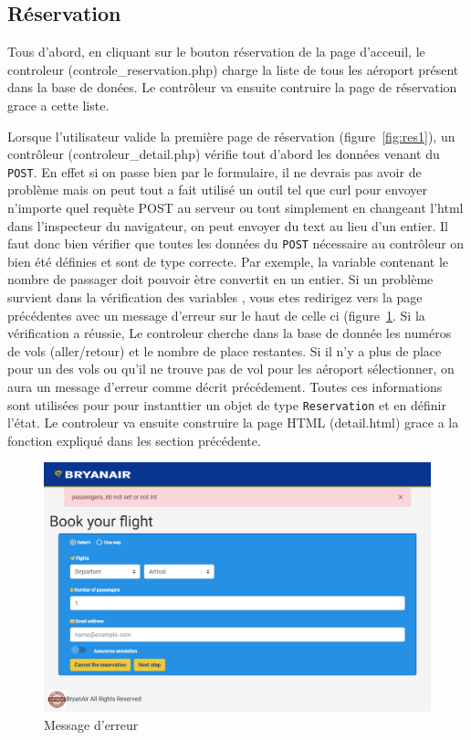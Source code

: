 \documentclass[12pt,a4paper]{article}
\begin{document}
		\subsection{Réservation}
      Tous d'abord, en cliquant sur le bouton réservation de la page d'acceuil, le controleur (controle\_reservation.php) charge la liste de tous les aéroport présent dans la base de donées. Le contrôleur va ensuite contruire la page de réservation grace a cette liste.

			Lorsque l'utilisateur valide la première page de réservation (figure~\ref{fig:res1}), un contrôleur (controleur\_detail.php) vérifie tout d'abord les données venant du \texttt{POST}. En effet si on passe bien par le formulaire, il ne devrais pas avoir de problème mais on peut tout a fait utilisé un outil tel que curl pour envoyer n'importe quel requète POST au serveur ou tout simplement en changeant l'html dans l'inspecteur du navigateur, on peut envoyer du text au lieu d'un entier. Il faut donc bien vérifier que toutes les données du \texttt{POST} nécessaire au contrôleur on bien été définies et sont de type correcte. Par exemple, la variable contenant le nombre de passager doit pouvoir ètre convertit en un entier. Si un problème survient dans la vérification des variables , vous etes redirigez vers la page précédentes avec un message d'erreur sur le haut de celle ci (figure~\ref{fig:error}. Si la vérification a réussie, Le controleur cherche dans la base de donnée les numéros de vols (aller/retour) et le nombre de place restantes. Si il n'y a plus de place pour un des vols ou qu'il ne trouve pas de vol pour les aéroport sélectionner, on aura un message d'erreur comme décrit précédement. Toutes ces informations sont utilisées pour pour instanttier un objet de type \texttt{Reservation} et en définir l'état. Le controleur va ensuite construire la page HTML (detail.html) grace a la fonction expliqué dans les section précédente.
			\begin{figure}
        \includegraphics[width=\textwidth]{Error.png}
				\caption{Message d'erreur}
				\label{fig:error}
			\end{figure}
\end{document}

